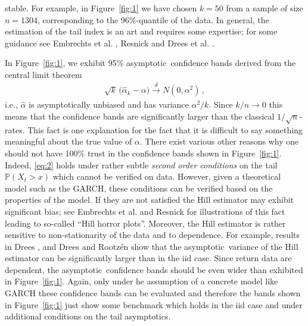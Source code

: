 \documentclass[11pt,a4]{amsart}
\newcommand{\clt}{central limit theorem}
\newcommand{\asy}{asymptotic}
\newcommand{\beam}{\begin{eqnarray}}
\newcommand{\eeam}{\end{eqnarray}\noindent}
\newcommand{\std}{\stackrel{d}{\rightarrow}}
\renewcommand{\P }{{\mathbb P}}
\newcommand{\1}{{\mathbf 1}}
\begin{document}
stable. For example, in Figure~\ref{fig:1} we have chosen $k=50$ from
a sample of size $n=1304$, corresponding to the 96\%-quantile of the
data. In general, the estimation of the tail index is an art and
requires some expertise; for some guidance
see Embrechts et al. \cite{embrechts:klueppelberg:mikosch:1997},
Resnick \cite{resnick:2007} and Drees et al. 
\cite{drees:resnick:2000}. 
\par
In Figure~\ref{fig:1},
we exhibit 95\% \asy\ confidence bands derived from  the \clt
\beam\label{eq:2}
\sqrt k\, \big(\hat \alpha_k - \alpha\big) \std N(0, \alpha^2)\,,
\eeam
i.e., $\hat \alpha$ is \asy ally unbiased and has variance
$\alpha^2/k$. Since $k/n\to 0$ this means that the 
confidence bands are significantly larger than the classical
$1/\sqrt{n}$-rates. This fact is one explanation for the fact that it is
difficult to say something meaningful about the true value of
$\alpha$. There exist various other reasons why one should
not have 100\% trust in the confidence bands shown in
Figure~\ref{fig:1}. Indeed, \eqref{eq:2}
holds under rather subtle {\em second order conditions} on the tail
$\P(X_t>x)$ which cannot be verified on data. However, 
given a theoretical model such as the GARCH, these conditions can be
verified based on the properties of the model. If they are not satisfied the 
Hill estimator may exhibit significant bias; see Embrechts et
al. \cite{embrechts:klueppelberg:mikosch:1997} and Resnick \cite{resnick:1987} for illustrations 
of this fact leading to so-called ``Hill horror plots''. Moreover, the
Hill estimator is rather sensitive to non-stationarity 
of the data and to dependence. For example, results in Drees \cite{drees:2008}, and Drees and
Rootz\'en \cite{drees:rootzen:2010} show that the \asy\ variance of the
Hill estimator can be significantly larger than in the iid case. 
Since return data are dependent, the \asy\ confidence bands should be
even wider than exhibited in Figure~\ref{fig:1}. 
Again, only under he assumption of a concrete model like GARCH these
confidence bands can be evaluated and therefore the bands shown in Figure~\ref{fig:1}
just show some benchmark which holds in the iid case and under additional conditions on the tail \asy s.
\end{document}

